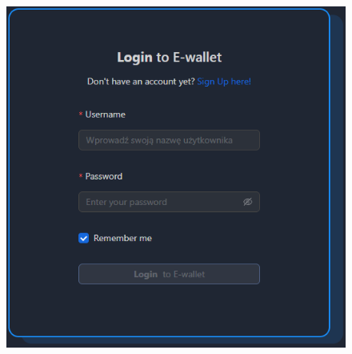 \begin{frame}{\insertsection}
\begin{columns}
\begin{figure}
			\includegraphics[width=1\linewidth]{../images/loginang.png}
		\end{figure}
	\end{columns}
\end{frame}

